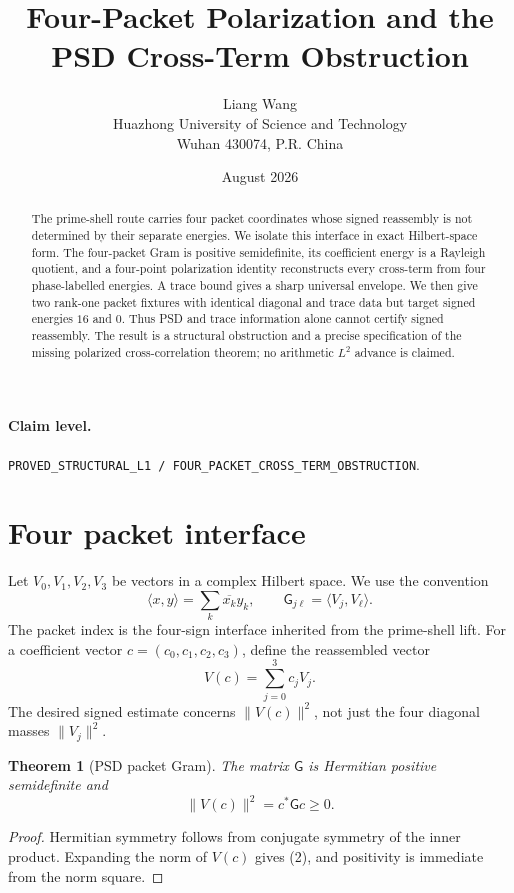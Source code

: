\documentclass[11pt]{article}
\title{Four-Packet Polarization and the PSD Cross-Term Obstruction}
\author{Liang Wang\\Huazhong University of Science and Technology\\Wuhan 430074, P.R. China}
\date{August 2026}
\newtheorem{theorem}{Theorem}
\newcommand{\G}{\mathsf G}
\begin{document}
\maketitle

\begin{abstract}
The prime-shell route carries four packet coordinates whose signed reassembly is not
determined by their separate energies.  We isolate this interface in exact Hilbert-space
form.  The four-packet Gram is positive semidefinite, its coefficient energy is a Rayleigh
quotient, and a four-point polarization identity reconstructs every cross-term from four
phase-labelled energies.  A trace bound gives a sharp universal envelope.  We then give two
rank-one packet fixtures with identical diagonal and trace data but target signed energies
$16$ and $0$.  Thus PSD and trace information alone cannot certify signed reassembly.  The
result is a structural obstruction and a precise specification of the missing polarized
cross-correlation theorem; no arithmetic $L^2$ advance is claimed.
\end{abstract}

\paragraph{Claim level.}
\texttt{PROVED\_STRUCTURAL\_L1 / FOUR\_PACKET\_CROSS\_TERM\_OBSTRUCTION}.

\section{Four packet interface}

Let $V_0,V_1,V_2,V_3$ be vectors in a complex Hilbert space.  We use the convention
\[
 \langle x,y\rangle=\sum_k\overline{x_k}y_k,
 \qquad
 \G_{j\ell}=\langle V_j,V_\ell\rangle.
 \tag{1}
\]
The packet index is the four-sign interface inherited from the prime-shell lift.  For a
coefficient vector $c=(c_0,c_1,c_2,c_3)$, define the reassembled vector
\[
 V(c)=\sum_{j=0}^3c_jV_j.
\]
The desired signed estimate concerns $\|V(c)\|^2$, not just the four diagonal masses
$\|V_j\|^2$.

\begin{theorem}[PSD packet Gram]
The matrix $\G$ is Hermitian positive semidefinite and
\[
 \|V(c)\|^2=c^*\G c\geq0.
 \tag{2}
\]
\end{theorem}

\begin{proof}
Hermitian symmetry follows from conjugate symmetry of the inner product.  Expanding the
norm of $V(c)$ gives (2), and positivity is immediate from the norm square.
\end{proof}
\end{document}
